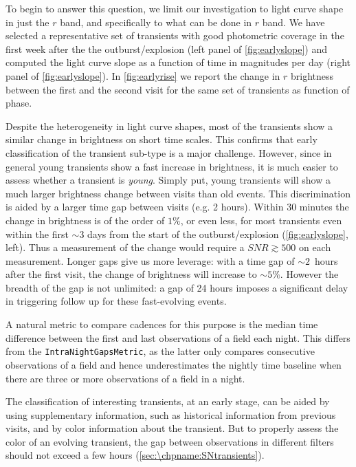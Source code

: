 To begin to answer this question, we limit our investigation to light curve shape in just the $r$ band, and specifically to what can be done in $r$ band. We have selected a representative set of transients with good photometric coverage in the first week after the the outburst/explosion (left panel of \autoref{fig:earlyslope}) and computed the light curve slope as a function of time in magnitudes per day (right panel of \autoref{fig:earlyslope}). In \autoref{fig:earlyrise} we report the change in $r$ brightness between the first and the second visit for the same set of transients as function of phase.

Despite the heterogeneity in light curve shapes, most of the transients show a similar change in brightness on short time scales.
This confirms that early classification of the transient sub-type is a
major challenge. However, since in general young transients show a fast
increase in brightness, it is much easier to assess whether a transient is
\emph{young}.  Simply put, young transients will show a much larger
brightness change between visits than old events.
This discrimination is aided by a larger time gap between visits (e.g. 2 hours).
Within 30 minutes the change in brightness is of the order of $1\%$, or
even less, for most transients even within the first $\sim3$ days from the
start of the outburst/explosion (\autoref{fig:earlyslope}, left). Thus a
measurement of the change would require a $SNR\gtrsim500$ on each
measurement. Longer gaps give us more leverage: with a time gap of
$\sim2$~hours after the first visit, the change of brightness will increase
to $\sim5\%$. However the breadth of the gap is not unlimited: a gap of 24
hours imposes a significant delay in triggering follow up for these
fast-evolving events.

A natural metric to compare cadences for this purpose
is the median time difference between
the first and last observations of a field each night.  This differs from
the \texttt{IntraNightGapsMetric}, as the latter only compares consecutive
observations of a field and hence underestimates the nightly time baseline
when there are three or more observations of a field in a night.

The classification of interesting transients, at an early stage, can be
aided by using supplementary information, such as historical information
from previous visits, and by color information about the transient. But to
properly assess the color of an evolving transient, the
gap between observations in different filters should not exceed a few hours
(\autoref{sec:\chpname:SNtransients}).

